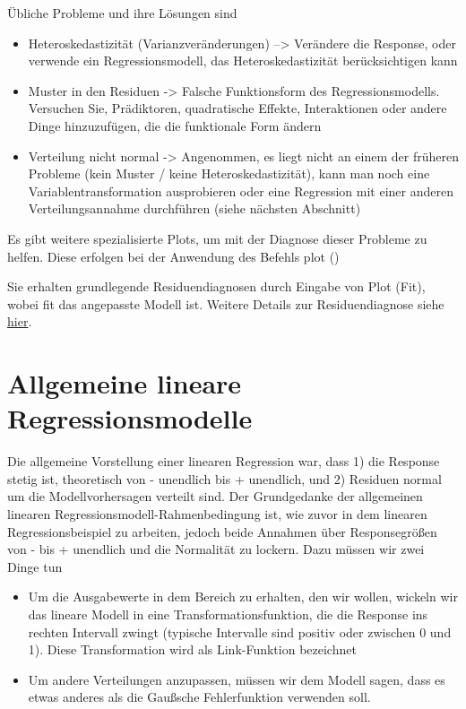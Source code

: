 \documentclass[a4paper,twoside]{tufte-book}\usepackage[]{graphicx}\usepackage[]{color}
\begin{document}
Übliche Probleme und ihre Lösungen sind  

\begin{itemize}
  \item Heteroskedastizität (Varianzveränderungen) --> Verändere die Response, oder verwende ein Regressionsmodell, das Heteroskedastizität berücksichtigen kann
  \item Muster in den Residuen -> Falsche Funktionsform des Regressionsmodells. Versuchen Sie, Prädiktoren, quadratische Effekte, Interaktionen oder andere Dinge hinzuzufügen, die die funktionale Form ändern
  \item Verteilung nicht normal -> Angenommen, es liegt nicht an einem der früheren Probleme (kein Muster / keine Heteroskedastizität), kann man noch eine Variablentransformation ausprobieren oder eine Regression mit einer anderen Verteilungsannahme durchführen (siehe nächsten Abschnitt)
\end{itemize}  

Es gibt weitere spezialisierte Plots, um mit der Diagnose dieser Probleme zu helfen. Diese erfolgen bei der Anwendung des Befehls plot ()


Sie erhalten grundlegende Residuendiagnosen durch Eingabe von Plot (Fit), wobei fit das angepasste Modell ist. Weitere Details zur Residuendiagnose siehe \href{http://www.statmethods.net/stats/rdiagnostics.html}{hier}.



\section{Allgemeine lineare Regressionsmodelle}

Die allgemeine Vorstellung einer linearen Regression war, dass 1) die Response stetig ist, theoretisch von - unendlich bis + unendlich, und 2) Residuen normal um die Modellvorhersagen verteilt sind. Der Grundgedanke der allgemeinen linearen Regressionsmodell-Rahmenbedingung ist, wie zuvor in dem linearen Regressionsbeispiel zu arbeiten, jedoch beide Annahmen über Responsegrößen von - bis + unendlich und die Normalität zu lockern. Dazu müssen wir zwei Dinge tun

\begin{itemize}
  \item Um die Ausgabewerte in dem Bereich zu erhalten, den wir wollen, wickeln wir das lineare Modell in eine Transformationsfunktion, die die Response ins rechten Intervall zwingt (typische Intervalle sind positiv oder zwischen 0 und 1). Diese Transformation wird als Link-Funktion bezeichnet
  \item Um andere Verteilungen anzupassen, müssen wir dem Modell sagen, dass es etwas anderes als die Gaußsche Fehlerfunktion verwenden soll.
\end{itemize}    
   
\end{document}
